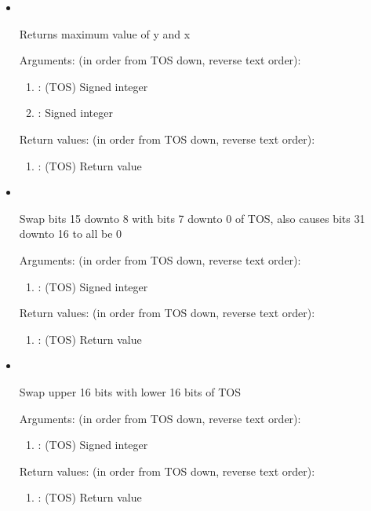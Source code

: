 \begin{itemize}
\item {}\ 

\noindent Returns maximum value of y and x

\noindent Arguments: (in order from TOS down, reverse text order):
\begin{enumerate}
\item {}: (TOS) Signed integer
\item {}: Signed integer
\end{enumerate}

\noindent Return values: (in order from TOS down, reverse text order):
\begin{enumerate}
\item {}: (TOS) Return value
\end{enumerate}

\item {}\ 

\noindent Swap bits 15 downto 8 with bits 7 downto 0 of TOS, also causes bits 31 downto 16 to all be 0

\noindent Arguments: (in order from TOS down, reverse text order):
\begin{enumerate}
\item {}: (TOS) Signed integer
\end{enumerate}

\noindent Return values: (in order from TOS down, reverse text order):
\begin{enumerate}
\item {}: (TOS) Return value
\end{enumerate}

\item {}\ 

\noindent Swap upper 16 bits with lower 16 bits of TOS

\noindent Arguments: (in order from TOS down, reverse text order):
\begin{enumerate}
\item {}: (TOS) Signed integer
\end{enumerate}

\noindent Return values: (in order from TOS down, reverse text order):
\begin{enumerate}
\item {}: (TOS) Return value
\end{enumerate}

\end{itemize}

